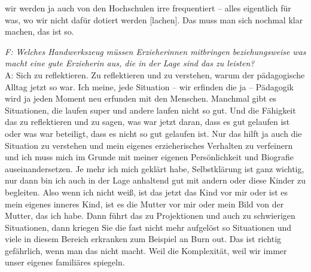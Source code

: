 \begin{linenumbers*}
wir werden ja auch von den Hochschulen irre frequentiert -- alles eigentlich für
was, wo wir nicht dafür dotiert werden {[lachen]}. Das muss man sich nochmal klar machen, das ist so.

\emph{F: Welches Handwerkszeug müssen Erzieherinnen mitbringen beziehungsweise was macht eine gute Erzieherin aus, die in der Lage sind das zu leisten?}\\
A: Sich zu reflektieren. Zu reflektieren und zu verstehen, warum der pädagogische Alltag jetzt so war. Ich meine, jede Situation -- wir erfinden die ja -- Pädagogik wird ja jeden Moment neu erfunden mit den Menschen. Manchmal gibt es Situationen, die laufen super und andere laufen nicht so gut. Und die Fähigkeit das zu reflektieren und zu sagen, was war jetzt daran, dass es gut gelaufen ist oder was war beteiligt, dass es nicht so gut gelaufen ist. Nur das hilft ja auch die Situation zu verstehen und mein eigenes erzieherisches Verhalten zu verfeinern und ich muss mich im Grunde mit meiner eigenen Persönlichkeit und Biografie auseinandersetzen. Je mehr ich mich geklärt habe, Selbstklärung ist ganz wichtig, nur dann bin ich auch in der Lage anhaltend gut mit andern oder diese Kinder zu begleiten. Also wenn ich nicht weiß, ist das jetzt das Kind vor mir oder ist es mein eigenes inneres Kind, ist es die Mutter vor mir oder mein Bild von der Mutter, das ich habe. Dann führt das zu Projektionen und auch zu schwierigen Situationen, dann kriegen Sie die fast nicht mehr aufgelöst so Situationen und viele in diesem Bereich erkranken zum Beispiel an Burn out. Das ist richtig gefährlich, wenn man das nicht macht. Weil die Komplexität, weil wir immer unser eigenes familiäres spiegeln. 


\end{linenumbers*}
